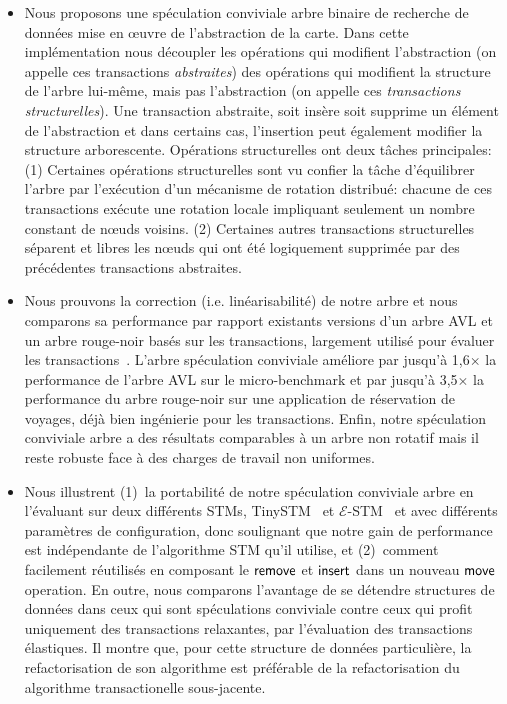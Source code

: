 \begin{itemize}

\item Nous proposons une spéculation conviviale arbre binaire de recherche de données   mise en œuvre de l'abstraction de la carte.
Dans cette implémentation nous découpler les opérations qui modifient l'abstraction
(on appelle ces transactions \emph{abstraites}) des opérations qui modifient la structure de l'arbre lui-même, mais pas l'abstraction (on appelle ces \emph{transactions structurelles}).
Une transaction abstraite, soit insère soit supprime un élément de l'abstraction et dans certains cas, l'insertion peut également modifier la structure arborescente.
Opérations structurelles ont deux tâches principales:
(1) Certaines opérations structurelles sont vu confier la tâche d'équilibrer l'arbre par l'exécution d'un mécanisme de rotation distribué:
chacune de ces transactions exécute une rotation locale impliquant seulement un nombre constant de nœuds voisins.
(2) Certaines autres transactions structurelles séparent et libres les nœuds qui ont été logiquement supprimée par des précédentes transactions abstraites.



\item Nous prouvons la correction (i.e. linéarisabilité) de notre arbre et nous comparons sa performance par rapport existants versions d'un arbre AVL
et un arbre rouge-noir basés sur les transactions, largement utilisé pour évaluer les transactions~\cite{DSS06, HLMS03, CCKO08, HK08 , FFR08, YNW 08, DFGG11}.
L'arbre spéculation conviviale améliore par jusqu'à 1,6$\times$ la performance de l'arbre AVL sur le micro-benchmark et par jusqu'à 3,5$\times$ la performance du arbre rouge-noir sur
une application de réservation de voyages, déjà bien ingénierie pour les transactions.
Enfin, notre spéculation conviviale arbre a des résultats comparables à un arbre non rotatif mais il reste robuste face à des charges de travail non uniformes.



\item Nous illustrent (1)~la portabilité de notre spéculation conviviale arbre en l'évaluant sur deux différents STMs, TinySTM~\cite{FFR08} et $\mathcal{E}$-STM~\cite{FGG09}
et avec différents paramètres de configuration, donc soulignant que notre gain de performance est indépendante de l'algorithme STM qu'il utilise,
et (2)~comment facilement réutilisés en composant le $\lit{remove}$ et $\lit{insert}$ dans un nouveau $\lit{move}$ operation.
En outre, nous comparons l'avantage de se détendre structures de données dans ceux qui sont spéculations conviviale contre ceux qui profit uniquement des transactions relaxantes, par l'évaluation des transactions élastiques.
Il montre que, pour cette structure de données particulière, la refactorisation de son algorithme est préférable de la refactorisation du algorithme transactionelle sous-jacente.



\end{itemize}


